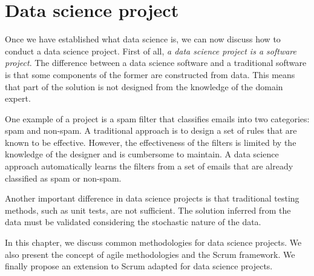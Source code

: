 \chapter{Data science project}
\label{chap:project}
\glsresetall



Once we have established what data science is, we can now discuss how to conduct a data science
project.
First of all, \emph{a data science project is a software project}.  The difference between a data
science software and a traditional software is that some components of the former are
constructed from data.  This means that part of the solution is not designed from the
knowledge of the domain expert.

One example of a project is a spam filter that
classifies emails into two categories: spam and non-spam.  A traditional approach is
to design a set of rules that are known to be effective.  However, the effectiveness of
the filters is limited by the knowledge of the designer and is cumbersome to maintain.  A
data science approach automatically learns the filters from a set of
emails that are already classified as spam or non-spam.

Another important difference in data science projects is that traditional testing methods,
such as unit tests, are not sufficient. The solution inferred from the data must be validated
considering the stochastic nature of the data.

In this chapter, we discuss common methodologies for data science projects.  We also
present the concept of agile methodologies and the Scrum framework.  We finally propose an
extension to Scrum adapted for data science projects.

